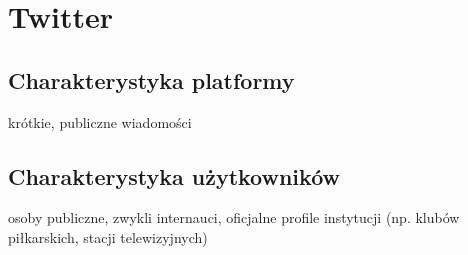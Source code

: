 \chapter{Twitter}
\section{Charakterystyka platformy}
krótkie, publiczne wiadomości
\section{Charakterystyka użytkowników}
osoby publiczne, zwykli internauci, oficjalne profile instytucji (np. klubów 
piłkarskich,
stacji telewizyjnych)
